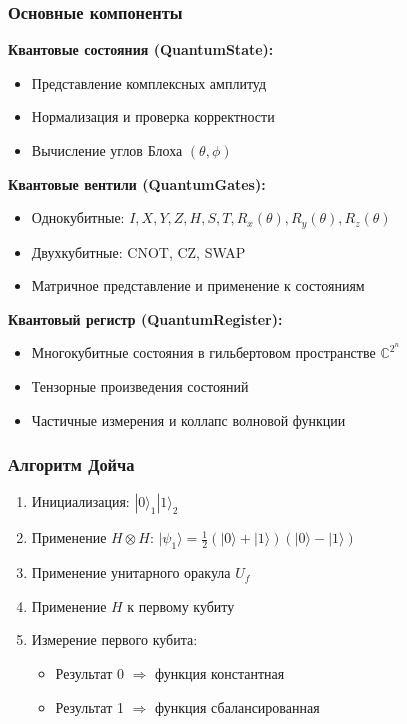 \documentclass[14pt,russian]{extarticle}
\begin{document}
\subsubsection{Основные компоненты}

\textbf{Квантовые состояния (QuantumState):}
\begin{itemize}
    \item Представление комплексных амплитуд
    \item Нормализация и проверка корректности
    \item Вычисление углов Блоха $(\theta, \phi)$
\end{itemize}

\textbf{Квантовые вентили (QuantumGates):}
\begin{itemize}
    \item Однокубитные: $I, X, Y, Z, H, S, T, R_x(\theta), R_y(\theta), R_z(\theta)$
    \item Двухкубитные: CNOT, CZ, SWAP
    \item Матричное представление и применение к состояниям
\end{itemize}

\textbf{Квантовый регистр (QuantumRegister):}
\begin{itemize}
    \item Многокубитные состояния в гильбертовом пространстве $\mathbb{C}^{2^n}$
    \item Тензорные произведения состояний
    \item Частичные измерения и коллапс волновой функции
\end{itemize}

\subsubsection{Алгоритм Дойча}

\begin{enumerate}
    \item Инициализация: $|0\rangle_1 |1\rangle_2$
    \item Применение $H \otimes H$: $|\psi_1\rangle = \frac{1}{2}(|0\rangle + |1\rangle)(|0\rangle - |1\rangle)$
    \item Применение унитарного оракула $U_f$
    \item Применение $H$ к первому кубиту
    \item Измерение первого кубита:
    \begin{itemize}
        \item Результат 0 $\Rightarrow$ функция константная
        \item Результат 1 $\Rightarrow$ функция сбалансированная
    \end{itemize}
\end{enumerate}
\end{document}
